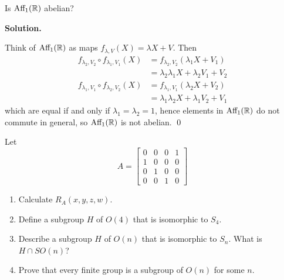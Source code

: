 \documentclass[12pt]{book}
\theoremstyle{definition}
\newenvironment{solution}
{%
  \par\noindent\textbf{Solution.}\quad
}
{%
  \qed\par
}
\begin{document}
\begin{taggedexercise}[\textcolor{green}{Complete}]
Is $\text{Aff}_1(\mathbb{R})$ abelian?
\end{taggedexercise}

\begin{solution}
Think of $\text{Aff}_1(\mathbb{R})$ as maps $f_{\lambda, V}(X) = \lambda X + V$.
Then
\[\begin{aligned}
  f_{\lambda_2, V_2} \circ f_{\lambda_1, V_1}(X) &= f_{\lambda_2, V_2}(\lambda_1 X + V_1) \\
                                                 &= \lambda_2 \lambda_1 X + \lambda_2 V_1 + V_2
\end{aligned}\]
\[\begin{aligned}
  f_{\lambda_1, V_1} \circ f_{\lambda_2, V_2}(X) &= f_{\lambda_1, V_1}(\lambda_2 X + V_2) \\
                                                 &= \lambda_1 \lambda_2 X + \lambda_1 V_2 + V_1
\end{aligned}\]
which are equal if and only if $\lambda_1 = \lambda_2 = 1$, hence elements in $\text{Aff}_1(\mathbb{R})$ do not commute in general, so $\text{Aff}_1(\mathbb{R})$ is not abelian.
\end{solution}

\begin{taggedexercise}[\textcolor{green}{Complete}]
Let 
\[
A = \begin{bmatrix}
  0 & 0 & 0 & 1 \\
  1 & 0 & 0 & 0 \\
  0 & 1 & 0 & 0 \\
  0 & 0 & 1 & 0
  \end{bmatrix}
\]
\begin{enumerate}
  \item Calculate $R_A(x,y,z,w)$.
  \item Define a subgroup $H$ of $O(4)$ that is isomorphic to $S_4$.
  \item Describe a subgroup $H$ of $O(n)$ that is isomorphic to $S_n$. What is $H \cap SO(n)$?
  \item Prove that every finite group is a subgroup of $O(n)$ for some $n$.
\end{enumerate}
\end{taggedexercise}
\end{document}
